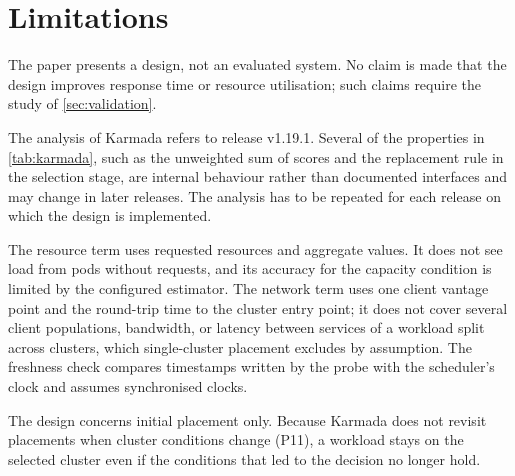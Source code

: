 \section{Limitations}\label{sec:limitations}

The paper presents a design, not an evaluated system. No claim is made that the design improves response time or resource utilisation; such claims require the study of \cref{sec:validation}.

The analysis of Karmada refers to release v1.19.1. Several of the properties in \cref{tab:karmada}, such as the unweighted sum of scores and the replacement rule in the selection stage, are internal behaviour rather than documented interfaces and may change in later releases. The analysis has to be repeated for each release on which the design is implemented.

The resource term uses requested resources and aggregate values. It does not see load from pods without requests, and its accuracy for the capacity condition is limited by the configured estimator. The network term uses one client vantage point and the round-trip time to the cluster entry point; it does not cover several client populations, bandwidth, or latency between services of a workload split across clusters, which single-cluster placement excludes by assumption. The freshness check compares timestamps written by the probe with the scheduler's clock and assumes synchronised clocks.

The design concerns initial placement only. Because Karmada does not revisit placements when cluster conditions change (P11), a workload stays on the selected cluster even if the conditions that led to the decision no longer hold.
